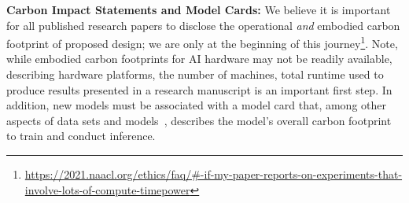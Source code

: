     


\textbf{Carbon Impact Statements and Model Cards:} 
We believe it is important for all published research papers to disclose the operational \textit{and} embodied carbon footprint of proposed design; we are only at the beginning of this journey\footnote{\url{https://2021.naacl.org/ethics/faq/\#-if-my-paper-reports-on-experiments-that-involve-lots-of-compute-timepower}}. Note, while embodied carbon footprints for AI hardware may not be readily available, describing hardware platforms, the number of machines, total runtime used to produce results presented in a research manuscript is an important first step.
In addition, new models must be associated with a model card that, among other aspects of data sets and models~\cite{Mitchell:fat:2019}, describes the model’s overall carbon footprint to train and conduct inference. 


